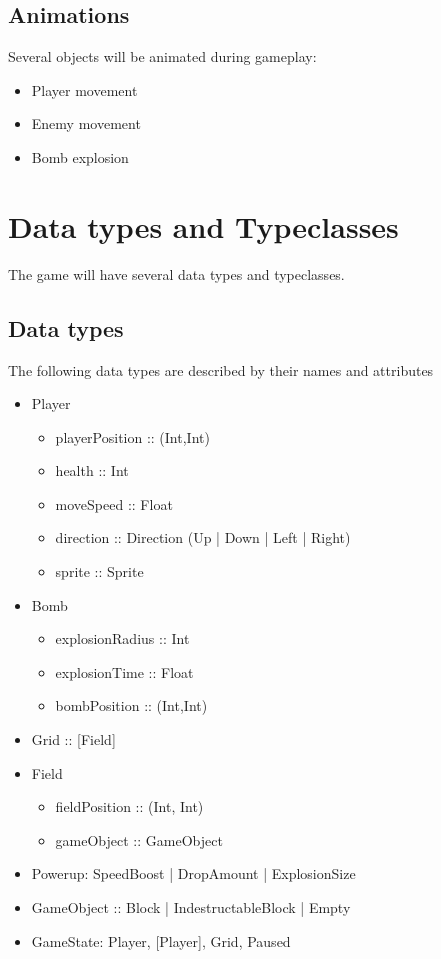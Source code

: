 \documentclass[a4paper, 12]{article}
\begin{document}
		
		\subsection{Animations}
		Several objects will be animated during gameplay:
		\begin{itemize}
			\item Player movement
			\item Enemy movement
			\item Bomb explosion
		\end{itemize}	
		
		\section{Data types and Typeclasses}
		The game will have several data types and typeclasses.
	
		
		\subsection{Data types}
		The following data types are described by their names and attributes
			\begin{itemize}
				\item Player
					\begin {itemize}
						\item playerPosition :: (Int,Int)
						\item health :: Int
						\item moveSpeed :: Float
						\item direction :: Direction (Up | Down | Left | Right)
						\item sprite :: Sprite
					\end{itemize}
				\item Bomb 
					\begin{itemize}
						\item explosionRadius :: Int
						\item explosionTime :: Float
						\item bombPosition :: (Int,Int)
					\end{itemize}
				\item Grid :: [Field]
				\item Field 
					\begin{itemize}
						\item fieldPosition :: (Int, Int)
						\item gameObject :: GameObject
					\end{itemize}					
				\item Powerup: SpeedBoost | DropAmount | 										ExplosionSize
				\item GameObject :: Block | IndestructableBlock | Empty
				\item GameState: Player, [Player], Grid, Paused
			\end{itemize}
				
\end{document}
